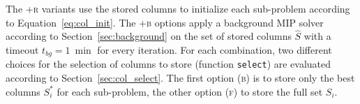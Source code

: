 \documentclass[]{amsart}
\newcommand{\lucas}[1]{{\color{red}#1}}
\theoremstyle{plain}
\begin{document}
The \textsc{+r} variants use the stored columns to initialize each sub-problem according to Equation~\eqref{eq:col_init}. The \textsc{+b} options apply a background MIP solver according to Section~\ref{sec:background} on the set of stored columns $\hat{S}$ with a timeout $t_{bg}=\qty{1}{\min}$ for every iteration. For each combination, two different choices for the selection of columns to store (function \texttt{select}) are evaluated according to Section~\ref{sec:col_select}. The first option \textsc{(b)} is to store only the best columns $S_i^*$ for each sub-problem, the other option \textsc{(f)} to store the full set $S_i$.




\end{document}
